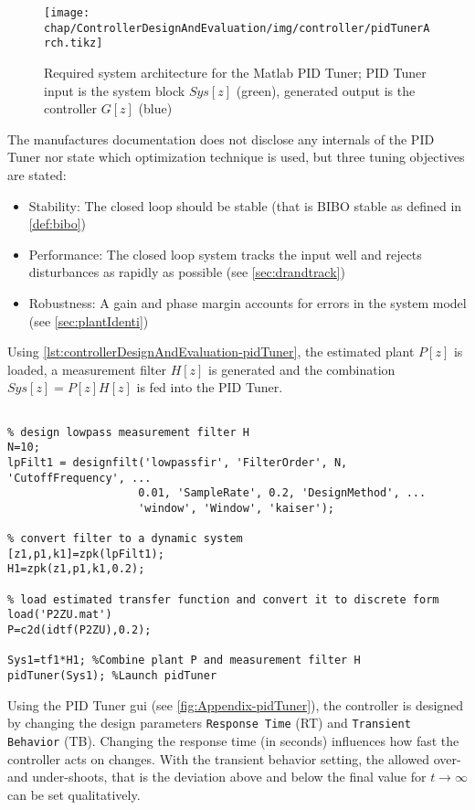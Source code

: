 \begin{figure}[tb]
	\centering
	\texttt{[image: chap/ControllerDesignAndEvaluation/img/controller/pidTunerArch.tikz]}
	\caption{Required system architecture for the Matlab PID Tuner; PID Tuner input is the system block $Sys[z]$ (green), generated output is the controller $G[z]$ (blue)}
	\label{fig:controllerDesignAndEvaluation-pidTunersys}
\end{figure}

The manufactures documentation \cite{pidTuner} does not disclose any internals of the PID Tuner nor state which optimization technique is used, but three tuning objectives are stated:
\begin{itemize}
\item Stability: The closed loop should be stable (that is BIBO stable as defined in \autoref{def:bibo})
\item Performance: The closed loop system tracks the input well and rejects disturbances as rapidly as possible (see \autoref{sec:drandtrack})
\item Robustness: A gain and phase margin accounts for errors in the system model (see \autoref{sec:plantIdenti})
\end{itemize}

Using \autoref{lst:controllerDesignAndEvaluation-pidTuner}, the estimated plant $P[z]$ is loaded, a measurement filter $H[z]$ is generated and the combination $Sys[z]=P[z]H[z]$ is fed into the PID Tuner.

\begin{lstlisting}[style=matlab,caption = Matlab script to generate an input system for PID Tuner, label = lst:controllerDesignAndEvaluation-pidTuner]

% design lowpass measurement filter H
N=10;
lpFilt1 = designfilt('lowpassfir', 'FilterOrder', N, 'CutoffFrequency', ...
                    0.01, 'SampleRate', 0.2, 'DesignMethod', ...
                    'window', 'Window', 'kaiser');

% convert filter to a dynamic system                
[z1,p1,k1]=zpk(lpFilt1);
H1=zpk(z1,p1,k1,0.2);

% load estimated transfer function and convert it to discrete form
load('P2ZU.mat')
P=c2d(idtf(P2ZU),0.2);

Sys1=tf1*H1; %Combine plant P and measurement filter H
pidTuner(Sys1); %Launch pidTuner
\end{lstlisting}

Using the PID Tuner \gls{gui} (see \autoref{fig:Appendix-pidTuner}), the controller is designed by changing the design parameters \texttt{Response Time} (RT) and \texttt{Transient Behavior} (TB). Changing the response time (in seconds) influences how fast the controller acts on changes. With the transient behavior setting, the allowed over- and under-shoots, that is the deviation above and below the final value for $t \rightarrow \infty$ can be set qualitatively.

